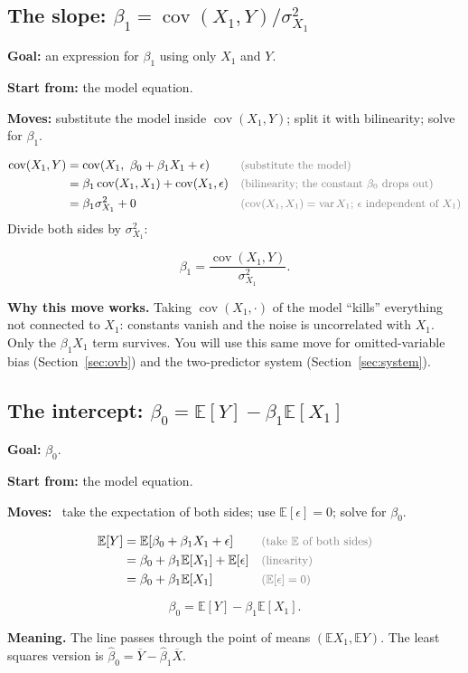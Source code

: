 \documentclass[11pt]{article}
\newcommand{\E}{\mathbb{E}}
\newcommand{\Var}{\operatorname{var}}
\newcommand{\Cov}{\operatorname{cov}}
\newcommand{\Ybar}{\overline{Y}}
\newcommand{\Xbar}{\overline{X}}
\newcommand{\why}[1]{&&\text{\small\color{gray}(#1)}}
\newcommand{\mv}[1]{\tcbox[on line, colback=methodclr, colframe=methodclr, coltext=white, boxsep=0pt,
  left=2pt, right=2pt, top=1pt, bottom=1pt, arc=1.5pt]{\sffamily\scriptsize\bfseries M#1}}
\newcommand{\goal}[1]{\textbf{Goal:} #1\par}
\newcommand{\start}[1]{\textbf{Start from:} #1\par}
\newcommand{\moves}[1]{\textbf{Moves:} #1\par}
\begin{document}
\subsection{The slope: $\beta_1=\Cov(X_1,Y)/\sigma_{X_1}^2$}\label{sec:beta1}
\begin{methodbox}
\goal{an expression for $\beta_1$ using only $X_1$ and $Y$.}
\start{the model equation.}
\moves{\mv{1} substitute the model inside $\Cov(X_1,Y)$; \mv{3} split it with bilinearity; solve for $\beta_1$.}
\end{methodbox}
\begin{align*}
\Cov(X_1,Y)&=\Cov(X_1,\ \beta_0+\beta_1X_1+\epsilon) \why{substitute the model}\\
&=\beta_1\Cov(X_1,X_1)+\Cov(X_1,\epsilon) \why{bilinearity; the constant $\beta_0$ drops out}\\
&=\beta_1\sigma_{X_1}^2+0 \why{$\Cov(X_1,X_1)=\Var X_1$; $\epsilon$ independent of $X_1$}
\end{align*}
Divide both sides by $\sigma_{X_1}^2$:
\begin{keybox}
\[\beta_1=\frac{\Cov(X_1,Y)}{\sigma_{X_1}^2}.\]
\end{keybox}
\textbf{Why this move works.} Taking $\Cov(X_1,\cdot)$ of the model ``kills'' everything not connected to $X_1$: constants vanish and the noise
is uncorrelated with $X_1$. Only the $\beta_1X_1$ term survives. You will use this same move for omitted-variable bias (Section~\ref{sec:ovb})
and the two-predictor system (Section~\ref{sec:system}).

\subsection{The intercept: $\beta_0=\E[Y]-\beta_1\E[X_1]$}\label{sec:beta0}
\begin{methodbox}
\goal{$\beta_0$.}
\start{the model equation.}
\moves{\mv{1}\,\mv{2} take the expectation of both sides; use $\E[\epsilon]=0$; solve for $\beta_0$.}
\end{methodbox}
\begin{align*}
\E[Y]&=\E[\beta_0+\beta_1X_1+\epsilon] \why{take $\E$ of both sides}\\
&=\beta_0+\beta_1\E[X_1]+\E[\epsilon] \why{linearity}\\
&=\beta_0+\beta_1\E[X_1] \why{$\E[\epsilon]=0$}
\end{align*}
\begin{keybox}
\[\beta_0=\E[Y]-\beta_1\E[X_1].\]
\end{keybox}
\textbf{Meaning.} The line passes through the point of means $(\E X_1,\E Y)$. The least squares version is $\hat\beta_0=\Ybar-\hat\beta_1\Xbar$.
\end{document}
